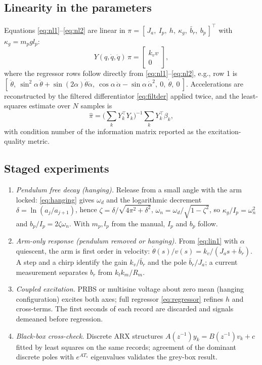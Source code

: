 \documentclass[conference]{IEEEtran}
\begin{document}
\subsection{Linearity in the parameters}
Equations \eqref{eq:nl1}--\eqref{eq:nl2} are linear in
$\pi = [\,J_a,\ I_p,\ h,\ \kappa_g,\ \bar b_r,\ b_p\,]^{\!\top}$ with $\kappa_g = m_p g l_p$:
\begin{equation}
Y(q,\dot q,\ddot q)\,\pi = \begin{bmatrix} k_v v\\ 0\end{bmatrix},
\label{eq:regressor}
\end{equation}
where the regressor rows follow directly from \eqref{eq:nl1}--\eqref{eq:nl2}, e.g., row 1 is
$[\ \ddot\theta,\ \sin^2\!\alpha\,\ddot\theta + \sin(2\alpha)\dot\theta\dot\alpha,\ \cos\alpha\,\ddot\alpha - \sin\alpha\,\dot\alpha^2,\ 0,\ \dot\theta,\ 0\ ]$.
Accelerations are reconstructed by the filtered differentiator \eqref{eq:filtder} applied twice, and the least-squares estimate over $N$ samples is
\begin{equation}
\hat\pi = \bigl(\textstyle\sum_k Y_k^{\!\top}Y_k\bigr)^{-1}\sum_k Y_k^{\!\top}\beta_k ,
\end{equation}
with condition number of the information matrix reported as the excitation-quality metric.

\subsection{Staged experiments}
\begin{enumerate}[label=E\arabic*)]
\item \emph{Pendulum free decay (hanging).} Release from a small angle with the arm locked: \eqref{eq:hanging} gives
$\omega_d$ and the logarithmic decrement $\delta = \ln(a_j/a_{j+1})$, hence
$\zeta = \delta/\sqrt{4\pi^2+\delta^2}$, $\omega_n = \omega_d/\sqrt{1-\zeta^2}$, so
$\kappa_g/I_p = \omega_n^2$ and $b_p/I_p = 2\zeta\omega_n$. With $m_p, l_p$ from the manual, $I_p$ and $b_p$ follow.
\item \emph{Arm-only response (pendulum removed or hanging).} From \eqref{eq:lin1} with $\alpha$ quiescent, the arm is first order in velocity: $\dot\theta(s)/v(s) = k_v/(J_a s + \bar b_r)$. A step and a chirp identify the gain $k_v/\bar b_r$ and the pole $\bar b_r/J_a$; a current measurement separates $b_r$ from $k_tk_m/R_m$.
\item \emph{Coupled excitation.} PRBS or multisine voltage about zero mean (hanging configuration) excites both axes; full regressor \eqref{eq:regressor} refines $h$ and cross-terms. The first seconds of each record are discarded and signals demeaned before regression.
\item \emph{Black-box cross-check.} Discrete ARX structures $A(z^{-1})y_k = B(z^{-1})v_k + c$ fitted by least squares on the same records; agreement of the dominant discrete poles with $e^{A T_s}$ eigenvalues validates the grey-box result.
\end{enumerate}
\end{document}
